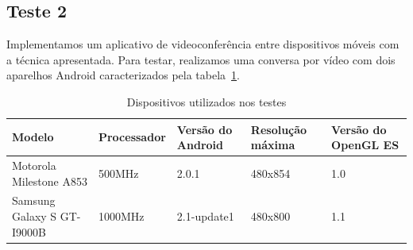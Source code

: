 \documentclass{acm_proc_article-sp}
\begin{document}
\subsection{Teste 2}
Implementamos um aplicativo de videoconferência entre dispositivos móveis com a técnica apresentada. Para testar, realizamos uma conversa por vídeo com dois aparelhos Android caracterizados pela tabela~\ref{tabela_dispositivos}.
\begin{table}
\centering
\caption{Dispositivos utilizados nos testes}
\label{tabela_dispositivos}
\begin{tabular}{|p{1.5cm}|p{1.5cm}|p{1cm}|p{1.5cm}|p{1cm}|} \hline
Modelo&Processador&Versão do Android&Resolução máxima&Versão do OpenGL ES\\ \hline
Motorola Milestone A853&500MHz&2.0.1&480x854&1.0\\ \hline
Samsung Galaxy S GT-I9000B&1000MHz&2.1-update1&480x800&1.1\\
\hline\end{tabular}
\end{table}
\end{document}
